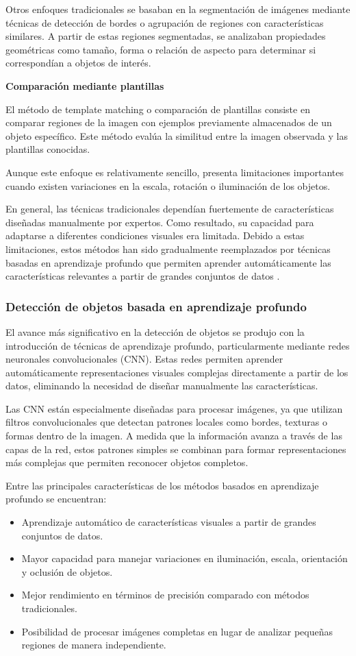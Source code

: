 Otros enfoques tradicionales se basaban en la segmentación de imágenes mediante técnicas de detección de bordes o agrupación de regiones con características similares. A partir de estas regiones segmentadas, se analizaban propiedades geométricas como tamaño, forma o relación de aspecto para determinar si correspondían a objetos de interés.

\textbf{Comparación mediante plantillas}

El método de template matching o comparación de plantillas consiste en comparar regiones de la imagen con ejemplos previamente almacenados de un objeto específico. Este método evalúa la similitud entre la imagen observada y las plantillas conocidas\cite{fvivas_guia_cv}.

Aunque este enfoque es relativamente sencillo, presenta limitaciones importantes cuando existen variaciones en la escala, rotación o iluminación de los objetos.

En general, las técnicas tradicionales dependían fuertemente de características diseñadas manualmente por expertos. Como resultado, su capacidad para adaptarse a diferentes condiciones visuales era limitada. Debido a estas limitaciones, estos métodos han sido gradualmente reemplazados por técnicas basadas en aprendizaje profundo que permiten aprender automáticamente las características relevantes a partir de grandes conjuntos de datos \cite{fvivas_guia_cv}.

\subsubsection{Detección de objetos basada en aprendizaje profundo}
El avance más significativo en la detección de objetos se produjo con la introducción de técnicas de aprendizaje profundo, particularmente mediante redes neuronales convolucionales (CNN). Estas redes permiten aprender automáticamente representaciones visuales complejas directamente a partir de los datos, eliminando la necesidad de diseñar manualmente las características.

Las CNN están especialmente diseñadas para procesar imágenes, ya que utilizan filtros convolucionales que detectan patrones locales como bordes, texturas o formas dentro de la imagen. A medida que la información avanza a través de las capas de la red, estos patrones simples se combinan para formar representaciones más complejas que permiten reconocer objetos completos.

Entre las principales características de los métodos basados en aprendizaje profundo se encuentran:
\begin{itemize}
    \item Aprendizaje automático de características visuales a partir de grandes conjuntos de datos.
    \item Mayor capacidad para manejar variaciones en iluminación, escala, orientación y oclusión de objetos.
    \item Mejor rendimiento en términos de precisión comparado con métodos tradicionales.
    \item Posibilidad de procesar imágenes completas en lugar de analizar pequeñas regiones de manera independiente.
\end{itemize}

